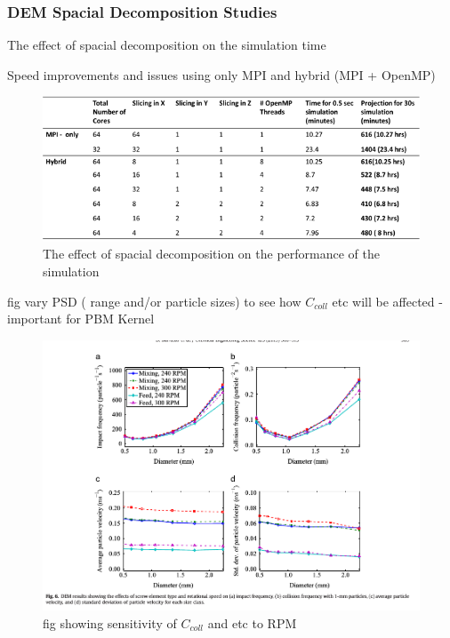 \documentclass[preprint,11pt,authoryear]{elsarticle}
\begin{document}
	    \subsubsection{DEM Spacial Decomposition Studies}
	    \par The effect of spacial decomposition on the simulation time
	    \par Speed improvements and issues using only MPI and hybrid (MPI + OpenMP)
	      \begin{figure}[H]
	      \centering
	      \includegraphics[scale=0.8]{slicing_studies.png}
	      \caption{The effect of spacial decomposition on the performance of the simulation}
	      \label{fig:rslts_DEM_slicing_studies}
	      \end{figure} 
	    \par fig vary PSD ( range and/or particle sizes) to see how $C_{coll}$ etc will be affected - important for PBM Kernel
	      \begin{figure}[H]
	      \centering
	      \includegraphics[scale=0.5]{dana_quad_impact_coll_vs_RPM}
	      \caption{ fig showing sensitivity of $C_{coll}$ and etc to RPM}
	      \label{fig:rslts_psd_velocity}
	      \end{figure} 
	        
\end{document}
